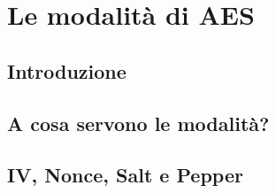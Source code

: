 
\chapter{Le modalità di AES}





\section{Introduzione}


\section{A cosa servono le modalità?} %

\textsf{\small }


\section{IV, Nonce, Salt e Pepper} %

\textsf{\small }




